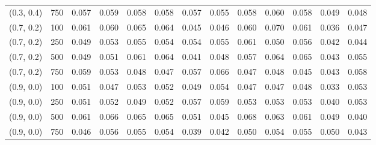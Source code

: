 \begin{table}[ht]
{\begin{tabular}{ll|ccccccccccc}
			(0.3, 0.4) & 750 & 0.057 & 0.059 & 0.058 & 0.058 & 0.057 & 0.055 & 0.058 & 0.060 & 0.058 & 0.049 & 0.048 \\
			(0.7, 0.2) & 100 & 0.061 & 0.060 & 0.065 & 0.064 & 0.045 & 0.046 & 0.060 & 0.070 & 0.061 & 0.036 & 0.047 \\
			(0.7, 0.2) & 250 & 0.049 & 0.053 & 0.055 & 0.054 & 0.054 & 0.055 & 0.061 & 0.050 & 0.056 & 0.042 & 0.044 \\
			(0.7, 0.2) & 500 & 0.049 & 0.051 & 0.061 & 0.064 & 0.041 & 0.048 & 0.057 & 0.064 & 0.065 & 0.043 & 0.055 \\
			(0.7, 0.2) & 750 & 0.059 & 0.053 & 0.048 & 0.047 & 0.057 & 0.066 & 0.047 & 0.048 & 0.045 & 0.043 & 0.058 \\
			(0.9, 0.0) & 100 & 0.051 & 0.047 & 0.053 & 0.052 & 0.049 & 0.054 & 0.047 & 0.047 & 0.048 & 0.033 & 0.053 \\
			(0.9, 0.0) & 250 & 0.051 & 0.052 & 0.049 & 0.052 & 0.057 & 0.059 & 0.053 & 0.053 & 0.053 & 0.040 & 0.053 \\
			(0.9, 0.0) & 500 & 0.061 & 0.066 & 0.065 & 0.065 & 0.051 & 0.045 & 0.068 & 0.063 & 0.061 & 0.049 & 0.040 \\
			(0.9, 0.0) & 750 & 0.046 & 0.056 & 0.055 & 0.054 & 0.039 & 0.042 & 0.050 & 0.054 & 0.055 & 0.050 & 0.043 \\
			\hline
		\end{tabular}
		
	}
\end{table}


